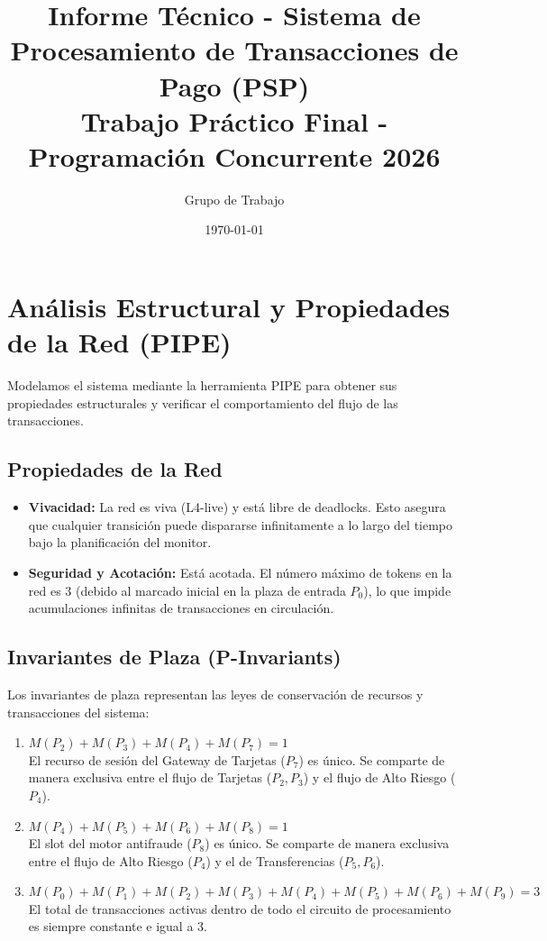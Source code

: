 \documentclass[12pt,a4paper]{article}
\title{Informe Técnico - Sistema de Procesamiento de Transacciones de Pago (PSP)\\
\large Trabajo Práctico Final - Programación Concurrente 2026}
\author{Grupo de Trabajo}
\date{\today}
\begin{document}
\maketitle

\section{Análisis Estructural y Propiedades de la Red (PIPE)}

Modelamos el sistema mediante la herramienta PIPE para obtener sus propiedades estructurales y verificar el comportamiento del flujo de las transacciones.

\subsection{Propiedades de la Red}
\begin{itemize}
    \item \textbf{Vivacidad:} La red es viva (L4-live) y está libre de deadlocks. Esto asegura que cualquier transición puede dispararse infinitamente a lo largo del tiempo bajo la planificación del monitor.
    \item \textbf{Seguridad y Acotación:} Está acotada. El número máximo de tokens en la red es 3 (debido al marcado inicial en la plaza de entrada $P_0$), lo que impide acumulaciones infinitas de transacciones en circulación.
\end{itemize}

\subsection{Invariantes de Plaza (P-Invariants)}
Los invariantes de plaza representan las leyes de conservación de recursos y transacciones del sistema:
\begin{enumerate}
    \item $M(P_2) + M(P_3) + M(P_4) + M(P_7) = 1$ \\
    El recurso de sesión del Gateway de Tarjetas ($P_7$) es único. Se comparte de manera exclusiva entre el flujo de Tarjetas ($P_2, P_3$) y el flujo de Alto Riesgo ($P_4$).
    \item $M(P_4) + M(P_5) + M(P_6) + M(P_8) = 1$ \\
    El slot del motor antifraude ($P_8$) es único. Se comparte de manera exclusiva entre el flujo de Alto Riesgo ($P_4$) y el de Transferencias ($P_5, P_6$).
    \item $M(P_0) + M(P_1) + M(P_2) + M(P_3) + M(P_4) + M(P_5) + M(P_6) + M(P_9) = 3$ \\
    El total de transacciones activas dentro de todo el circuito de procesamiento es siempre constante e igual a 3.
\end{enumerate}
\end{document}
